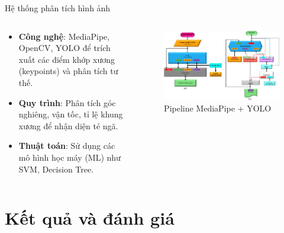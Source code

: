 \begin{frame}{Hệ thống phân tích hình ảnh}
    \begin{columns}[T]
        \begin{column}{0.48\textwidth}
            \begin{itemize}
                \item \textbf{Công nghệ}: MediaPipe, OpenCV, YOLO để trích xuất các điểm khớp xương (keypoints) và phân tích tư thế.
                \item \textbf{Quy trình}: Phân tích góc nghiêng, vận tốc, tỉ lệ khung xương để nhận diện té ngã.
                \item \textbf{Thuật toán}: Sử dụng các mô hình học máy (ML) như SVM, Decision Tree.
            \end{itemize}
        \end{column}
        \begin{column}{0.48\textwidth}
            \begin{figure}
                \centering
                \includegraphics[width=\textwidth]{images/media_pose_pipeline.png}
                \caption{Pipeline MediaPipe + YOLO}
            \end{figure}
        \end{column}
    \end{columns}
\end{frame}

\section{Kết quả và đánh giá}

